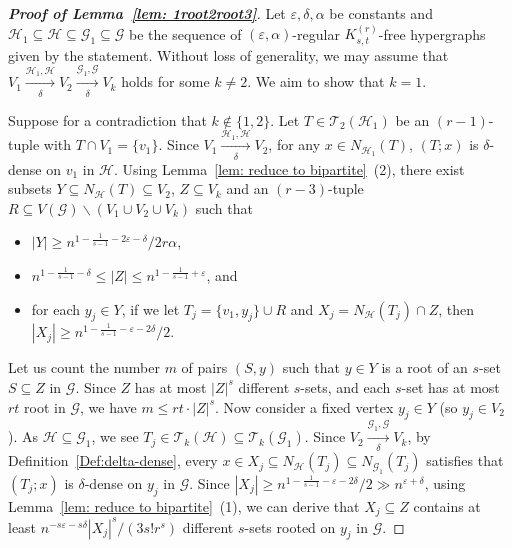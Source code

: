 \documentclass[11pt]{article}
\begin{document}
\begin{proof}[\bf Proof of Lemma~\ref{lem: 1root2root3}]
Let $\varepsilon, \delta, \alpha$ be constants and $\mathcal H_1\subseteq\mathcal H\subseteq \mathcal G_1 \subseteq\mathcal G$ be the sequence of
$(\varepsilon, \alpha)$-regular $K_{s,t}^{(r)}$-free hypergraphs given by the statement.
Without loss of generality, we may assume that $V_1 \xrightarrow[\delta]{\mathcal  H_1, \mathcal H}  V_2 \xrightarrow[\delta]{\mathcal  G_1,\mathcal G } V_k$ holds for some $k\neq 2$. We aim to show that $k=1$.

Suppose for a contradiction that $k\notin \{1,2\}$.
Let $T\in \mathcal T_2(\mathcal H_1)$ be an $(r-1)$-tuple with $T\cap V_1=\{v_1\}$.
Since $ V_1 \xrightarrow[\delta]{\mathcal  H_1, \mathcal H } V_2 $,
for any $x\in N_{\mathcal H_1}(T)$, $(T;x)$ is $\delta$-dense on $v_1$ in $\mathcal H$.
Using Lemma~\ref{lem: reduce to bipartite}~(2),
there exist subsets $Y\subseteq N_{\mathcal H}(T)\subseteq V_2$, $Z\subseteq V_k$ and an $(r-3)$-tuple $R\subseteq V(\mathcal G)\backslash (V_1\cup V_2\cup V_k)$ such that
\begin{itemize}
\item $|Y|\ge n^{1-\frac{1}{s-1} - 2 \varepsilon -\delta}/2r\alpha$,
\item  $n^{1-\frac{1}{s-1}  -\delta} \le |Z|\le n^{1-\frac{1}{s-1} + \varepsilon}$, and
\item for each $y_j\in Y$, if we let $T_j=\{v_1, y_j\}\cup R$ and $X_j=N_{\mathcal H}(T_j)\cap Z$, then $|X_j|\ge n^{1-\frac{1}{s-1}-\varepsilon-2\delta}/2$.
\end{itemize}
Let us count the number $m$ of pairs $(S,y)$ such that $y\in Y$ is a root of an $s$-set $S\subseteq Z$ in $\mathcal G$.
Since $Z$ has at most $|Z|^s$ different  $s$-sets, and each $s$-set has at most $rt$ root in $\mathcal G$, we have $m\le rt\cdot |Z|^s$.
Now consider a fixed vertex $y_j \in Y$ (so $y_j\in V_2$).
As $\mathcal H\subseteq \mathcal G_1$,
we see $T_j\in \mathcal T_k(\mathcal H)\subseteq \mathcal T_k(\mathcal G_1)$.
Since $V_2 \xrightarrow[\delta]{\mathcal  G_1,\mathcal G } V_k$,
by Definition~\ref{Def:delta-dense}, every $x\in X_j\subseteq N_{\mathcal H}(T_j)\subseteq N_{\mathcal G_1}(T_j)$ satisfies that
$(T_j;x)$ is $\delta$-dense on $y_j$ in $\mathcal G$.
Since $|X_j|\ge n^{1-\frac{1}{s-1}-\varepsilon-2\delta}/2\gg n^{\varepsilon+\delta}$,
using Lemma~\ref{lem: reduce to bipartite}~(1), we can derive that $X_j\subseteq Z$ contains at least $n^{- s\varepsilon-s\delta }|X_j|^s/(3s!r^s)$ different $s$-sets rooted on $y_j$ in $\mathcal G$.

\end{proof}
\end{document}
